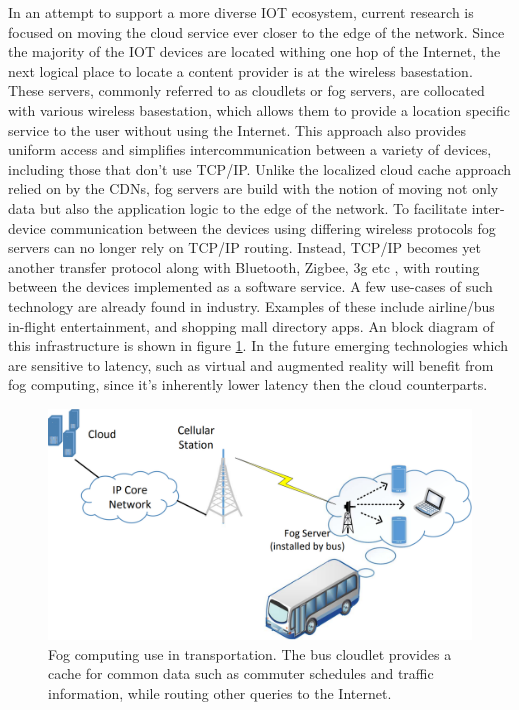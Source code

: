 In an attempt to support a more diverse IOT ecosystem, current research is focused on moving the cloud service ever closer to the edge of the network. Since the majority of the IOT devices are located withing one hop of the Internet, the next logical place to locate a content provider is at the wireless basestation.\cite{satyanarayanan2017emergence} These servers, commonly referred to as cloudlets or fog servers, are collocated with various wireless basestation, which allows them to provide a location specific service to the user without using the Internet. This approach also provides uniform access and simplifies intercommunication between a variety of devices, including those that don't use TCP/IP. Unlike the localized cloud cache approach relied on by the CDNs, fog servers are build with the notion of moving not only data but also the application logic to the edge of the network. To facilitate inter-device communication between the devices using differing wireless protocols fog servers can no longer rely on TCP/IP routing. Instead, TCP/IP becomes yet another transfer protocol along with Bluetooth, Zigbee, 3g etc , with routing between the devices implemented as a software service.\cite{edgeiot} A few use-cases of such technology are already found in industry. Examples of these include airline/bus in-flight entertainment, and shopping mall directory apps. An block diagram of this infrastructure is shown in figure \ref{lit:fig:3}. In the future emerging technologies which are sensitive to latency, such as virtual and augmented reality will benefit from fog computing, since it's inherently lower latency then the cloud counterparts.

\begin{figure}[h]
	\centering
	\includegraphics[width=0.6\linewidth]{img/fog_comp.png}	
	\caption{Fog computing use in transportation. The bus cloudlet provides a cache for common data such as commuter schedules and traffic information, while routing other queries to the Internet.\cite{edgeiot}}
	\label{lit:fig:3}
\end{figure}

